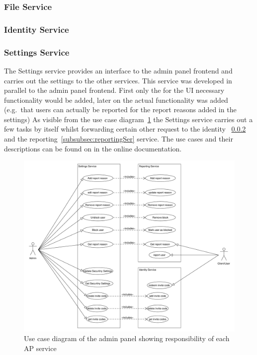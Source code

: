 \subsubsection{File Service}

\subsubsection{Identity Service}
\label{subsubsec:identitySer}

\subsubsection{Settings Service}
\label{subsubsec:settingsSer}
The Settings service provides an interface to the admin panel frontend and carries out the settings to the other services.
This service was developed in parallel to the admin panel frontend. %
First only the for the UI necessary functionality would be added, later on the actual functionality was added (e.g.\ that users can actually be reported for the report reasons added in the settings)
As visible from the use case diagram~\ref{fig:ucd} the Settings service carries out a few tasks by itself whilst forwarding
certain other request to the identity ~\ref{subsubsec:identitySer} and the reporting~\ref{subsubsec:reportingSer} service.
The use cases and their descriptions can be found on in the online documentation.

\begin{figure}[!ht]
    \centering
    \includegraphics[width=1.0\textwidth]{./images/UseCaseDiagramAdminPanel.pdf}
    \caption{Use case diagram of the admin panel showing responsibility of each AP service}
    \label{fig:ucd}
\end{figure}

